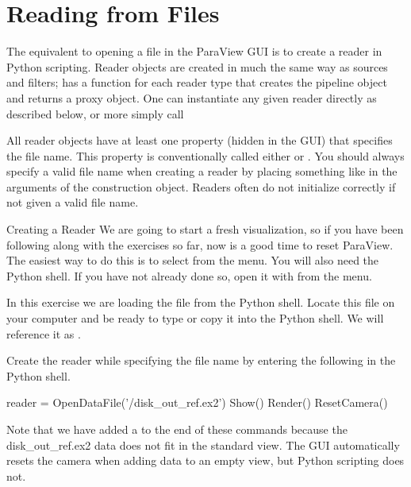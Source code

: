\section{Reading from Files}
\label{sec:ReadingFromFiles}

The equivalent to opening a file in the ParaView GUI is to create a reader
in Python scripting.  Reader objects are created in much the same way as
sources and filters;  has a function for each
reader type that creates the pipeline object and returns a
proxy object. One can instantiate any given reader
directly as described below, or more simply call 

All reader objects have at least one property (hidden in the GUI) that
specifies the file name.  This property is conventionally called either
 or .  You should always specify a valid
file name when creating a reader by placing something like
 in the arguments of the construction
object.  Readers often do not initialize correctly if not given a valid
file name.

\begin{exercise}{Creating a Reader}
  \label{ex:CreatingAReader}%
  We are going to start a fresh visualization, so if you have been
  following along with the exercises so far, now is a good time to reset
  ParaView.  The easiest way to do this is to select  \ra
   from the menu.  You will also need the Python shell.
  If you have not already done so, open it with  \ra {} from the menu.

  In this exercise we are loading the  file from
  the Python shell.  Locate this file on your computer and be ready to type
  or copy it into the Python shell.  We will reference it as
  .

  Create the reader while specifying the file name by entering the following
  in the Python shell.

  \begin{pythonpluscommands}
reader = OpenDataFile('/disk_out_ref.ex2')
Show()
Render()
ResetCamera()
  \end{pythonpluscommands}

  Note that we have added a  to the end of these
  commands because the disk\_out\_ref.ex2 data does not fit in the standard
  view. The GUI automatically resets the camera when adding data to an
  empty view, but Python scripting does not.
\end{exercise}


